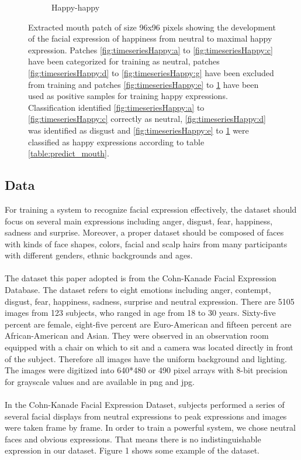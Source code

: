 \begin{figure}[H]
\begin{subfigure}[b]{0.15\textwidth}
		\caption{Happy-happy}
		\label{fig:timeseriesHappy:m}
	\end{subfigure}
	\caption[Complete time series of happy mouth patches]{Extracted mouth patch of size 96x96 pixels showing the development of
	the facial expression of happiness from neutral to maximal happy expression.
	Patches \ref{fig:timeseriesHappy:a} to \ref{fig:timeseriesHappy:c} have been
	categorized for training as neutral, patches \ref{fig:timeseriesHappy:d} to
	\ref{fig:timeseriesHappy:g} have been excluded from training and patches
	\ref{fig:timeseriesHappy:e} to \ref{fig:timeseriesHappy:m} have been used as
	positive samples for training happy expressions. Classification identified
	\ref{fig:timeseriesHappy:a} to \ref{fig:timeseriesHappy:c} correctly as
	neutral, \ref{fig:timeseriesHappy:d} was identified as disgust and
	\ref{fig:timeseriesHappy:e} to \ref{fig:timeseriesHappy:m} were classified as
	happy expressions according to table \ref{table:predict_mouth}.}
	\label{fig:timeseriesHappy}
\end{figure}

\subsection{Data}
For training a system to recognize facial expression effectively, the dataset should focus on several main expressions including anger, disgust, fear, happiness, sadness and surprise. Moreover, a proper dataset should be composed of faces with kinds of face shapes, colors, facial and scalp hairs from many participants with different genders, ethnic backgrounds and ages. 
\\
\\
The dataset this paper adopted is from the Cohn-Kanade Facial Expression Database. The dataset refers to eight emotions including anger, contempt, disgust, fear, happiness, sadness, surprise and neutral expression. There are 5105 images from 123 subjects, who ranged in age from 18 to 30 years. Sixty-five percent are female, eight-five percent are Euro-American and fifteen percent are African-American and Asian. They were observed in an observation room equipped with a chair on which to sit and a camera was located directly in front of the subject. Therefore all images have the uniform background and lighting. The images were digitized into 640*480 or 490 pixel arrays with 8-bit precision for grayscale values and are available in png and jpg. 
\\
\\
In the Cohn-Kanade Facial Expression Dataset, subjects performed a series of several facial displays from neutral expressions to peak expressions and images were taken frame by frame. In order to train a powerful system, we chose neutral faces and obvious expressions. That means there is no indistinguishable expression in our dataset. Figure 1 shows some example of the dataset.



